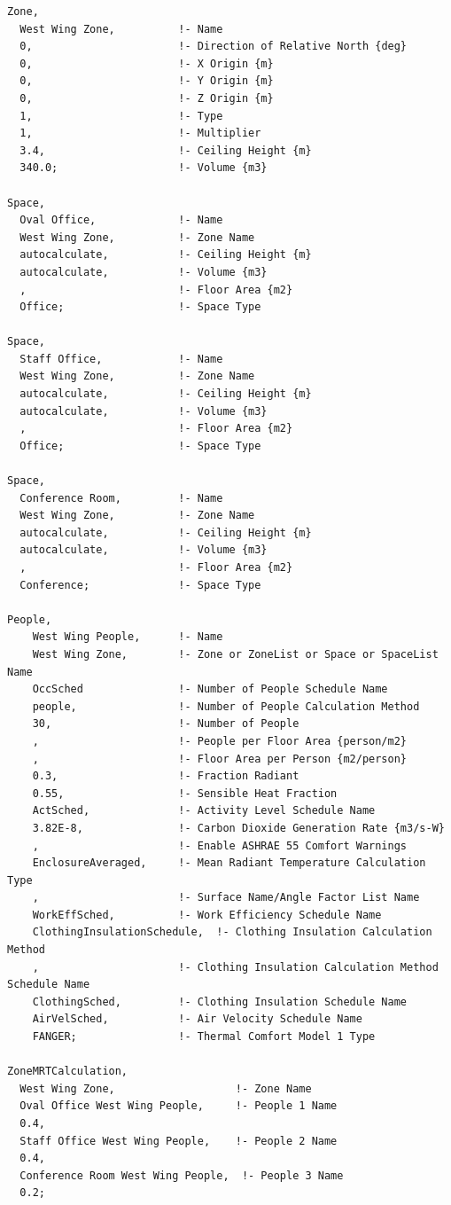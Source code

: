 \begin{lstlisting}
Zone,
  West Wing Zone,          !- Name
  0,                       !- Direction of Relative North {deg}
  0,                       !- X Origin {m}
  0,                       !- Y Origin {m}
  0,                       !- Z Origin {m}
  1,                       !- Type
  1,                       !- Multiplier
  3.4,                     !- Ceiling Height {m}
  340.0;                   !- Volume {m3}
  
Space,
  Oval Office,             !- Name
  West Wing Zone,          !- Zone Name
  autocalculate,           !- Ceiling Height {m}
  autocalculate,           !- Volume {m3}
  ,                        !- Floor Area {m2}
  Office;                  !- Space Type

Space,
  Staff Office,            !- Name
  West Wing Zone,          !- Zone Name
  autocalculate,           !- Ceiling Height {m}
  autocalculate,           !- Volume {m3}
  ,                        !- Floor Area {m2}
  Office;                  !- Space Type

Space,
  Conference Room,         !- Name
  West Wing Zone,          !- Zone Name
  autocalculate,           !- Ceiling Height {m}
  autocalculate,           !- Volume {m3}
  ,                        !- Floor Area {m2}
  Conference;              !- Space Type

People,
    West Wing People,      !- Name
    West Wing Zone,        !- Zone or ZoneList or Space or SpaceList Name
    OccSched               !- Number of People Schedule Name
    people,                !- Number of People Calculation Method
    30,                    !- Number of People
    ,                      !- People per Floor Area {person/m2}
    ,                      !- Floor Area per Person {m2/person}
    0.3,                   !- Fraction Radiant
    0.55,                  !- Sensible Heat Fraction
    ActSched,              !- Activity Level Schedule Name
    3.82E-8,               !- Carbon Dioxide Generation Rate {m3/s-W}
    ,                      !- Enable ASHRAE 55 Comfort Warnings
    EnclosureAveraged,     !- Mean Radiant Temperature Calculation Type
    ,                      !- Surface Name/Angle Factor List Name
    WorkEffSched,          !- Work Efficiency Schedule Name
    ClothingInsulationSchedule,  !- Clothing Insulation Calculation Method
    ,                      !- Clothing Insulation Calculation Method Schedule Name
    ClothingSched,         !- Clothing Insulation Schedule Name
    AirVelSched,           !- Air Velocity Schedule Name
    FANGER;                !- Thermal Comfort Model 1 Type

ZoneMRTCalculation,
  West Wing Zone,                   !- Zone Name
  Oval Office West Wing People,     !- People 1 Name
  0.4,
  Staff Office West Wing People,    !- People 2 Name
  0.4,
  Conference Room West Wing People,  !- People 3 Name
  0.2;
\end{lstlisting}

